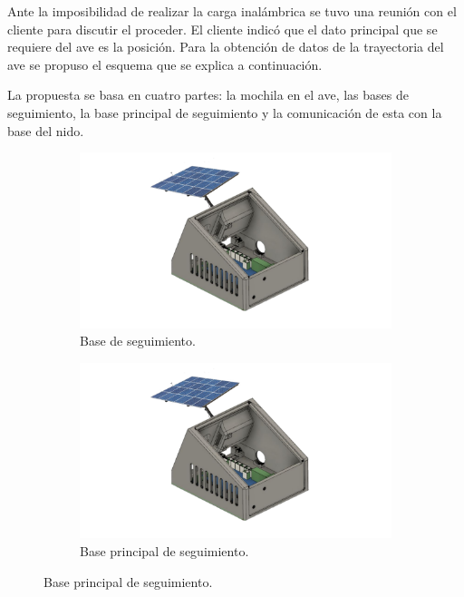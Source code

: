 Ante la imposibilidad de realizar la carga inalámbrica se tuvo una reunión con el cliente para discutir el proceder. El cliente indicó que el dato principal que se requiere del ave es la posición. Para la obtención de datos de la trayectoria del ave se propuso el esquema que se explica a continuación.

La propuesta se basa en cuatro partes: la mochila en el ave, las bases de seguimiento, la base principal de seguimiento y la comunicación de esta con la base del nido. 
\begin{figure}[H]
	\centering
	\begin{subfigure}{0.5\textwidth}
    	\centering
    	\includegraphics[width=\linewidth, page=1]{ImagenesFactibilidad/beacon}
    	\caption{Base de seguimiento.}
    	\label{fact:seguimiento}
    \end{subfigure}\hfill
    \begin{subfigure}{0.5\textwidth}
    	\centering
    	\includegraphics[width=\linewidth, page=2]{ImagenesFactibilidad/beacon}
    	\caption{Base principal de seguimiento.}
    	\label{fact:seguimientomain}

\end{subfigure}
\end{figure}
